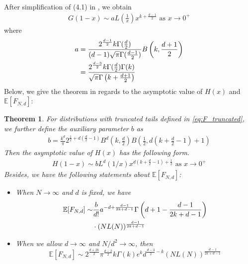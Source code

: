 \documentclass[conference,a4paper]{IEEEtran}
\def\E{\mathbb{E}}
\newtheorem{theorem}{Theorem}
\begin{document}
After simplification of (4.1) in \cite{dwyer1991convex}, we obtain
\begin{align}
    G(1-x) \sim a
    L\left(\frac{1}{x} \right)
    x^{k+\frac{d-1}{2}} \textrm{ as } x \to 0^+ 
    \label{eq:truncated_G_1_x}
\end{align}
where
\begin{align}
a &=\frac{2^{\frac{d-1}{2}} k \Gamma(\frac{d}{2})}
    {(d-1) \sqrt{\pi} \Gamma(\frac{d-1}{2})}
    B\left(k, \frac{d+1}{2}\right) \notag \\
    &= \frac{2^{\frac{d-3}{2}} k \Gamma(\frac{d}{2})\Gamma(k)}
    {\sqrt{\pi} \Gamma\left(k+\frac{d+1}{2}\right)}
    \label{eq:a}
\end{align}
Below, we give the theorem in regards to the asymptotic value of $H(x)$ and $\E[F_{N,d}]$:
\begin{theorem}\label{thm:truncated_tails}
     For distributions with truncated tails
     defined in \eqref{eq:F_truncated}, we further define
     the auxiliary parameter $b$ as
     \begin{align}
          b =  \frac{k^d}{\pi}
          2^{\frac{1}{2} + d(\frac{d}{2}-1)} B^d\left(k, \frac{d}{2}\right)
          B\left( \frac{1}{2},
          d\left(k+\frac{d}{2} -1 \right)+1 \right)
          \label{eq:b}
      \end{align}
      Then the asymptotic value of $H(x)$ has the following form.
      \begin{align}
          H(1-x)  \sim b
          L^d(1/x) x^{d(k+\frac{d}{2}-1)+\frac{1}{2}} 
          \textrm{ as } x \to 0^+ \label{eq:truncated_H_1_x}
     \end{align}     
     Besides, we have
 the following statements about $\E[F_{N,d}]$:
\begin{itemize}
     \item When $N\to \infty$ and $d$ is fixed, we have
     \begin{align}\label{eq:efn_truncated_formula}
          \E[F_{N,d}] \sim &\frac{b}{d!}a^{-d+\frac{d-1}{2k+d-1}}
          \Gamma 
          \left(d+1-\frac{d-1}{2k+d-1}\right)
          \notag\\
          &\cdot (NL(N))^{\frac{d-1}{2k+d-1}}
      \end{align}
     \item  When we allow $d\to \infty$ and $N/d^2 \to \infty$, then
     \begin{equation}\label{eq:truncated_d_inf}
      \E[F_{N,d}] \sim 2^{\frac{d+2k}{2}}\pi^{\frac{d-2}{2}} k\Gamma(k)e^k d^{\frac{d-3}{2}-k}
      (NL(N))^{\frac{d-1}{2k+d-1}}
     \end{equation}    
\end{itemize}
\end{theorem}
\end{document}
